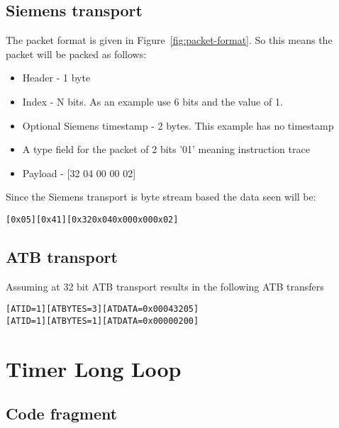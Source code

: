 \subsection{Siemens transport}

The packet format is given in Figure~\ref{fig:packet-format}. So this means the packet will be packed as follows:

\begin{itemize}
\item
  Header - 1 byte
\item
  Index - N bits. As an example use 6 bits and the value of 1. 
\item
  Optional Siemens timestamp - 2 bytes. This example has no timestamp
\item
A type field for the packet of 2 bits '01' meaning instruction trace  
\item
  Payload - [32 04 00 00 02]
\end{itemize}

Since the Siemens transport is byte stream based the data seen will be:

\begin {alltt}
[0x05][0x41][0x32 0x04 0x00 0x00 0x02]
\end{alltt}


\subsection{ATB transport}

Assuming at 32 bit ATB transport results in the following ATB transfers

\begin {alltt}
[ATID=1] [ATBYTES = 3] [ATDATA = 0x00043205]
[ATID=1] [ATBYTES = 1] [ATDATA = 0x00000200]
\end{alltt}


\section{Timer Long Loop}

\subsection{Code fragment}

